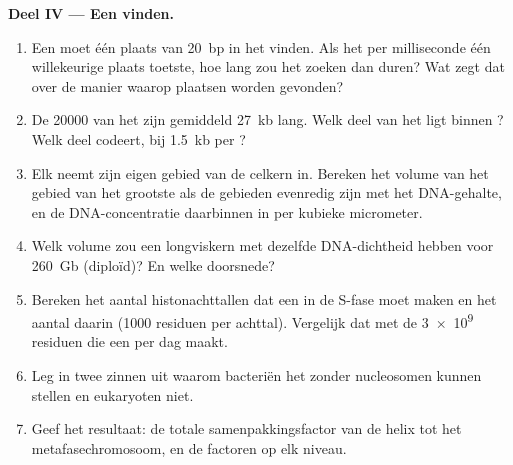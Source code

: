 \begin{problem}
\medskip
\noindent\textbf{Deel IV --- Een  vinden.}
\begin{enumerate}[resume]
  \item Een  moet één plaats van \qty{20}{bp} in het  vinden.
        Als het per milliseconde één willekeurige plaats toetste, hoe lang
        zou het zoeken dan duren? Wat zegt dat over de manier waarop
        plaatsen worden gevonden?
  \item De \qty{20000}{}  van het  zijn gemiddeld \qty{27}{kb}
        lang. Welk deel van het  ligt binnen ? Welk deel
        codeert, bij \qty{1.5}{kb}  per ?
  \item Elk  neemt zijn eigen gebied van de celkern in. Bereken
        het volume van het gebied van het grootste  als de
        gebieden evenredig zijn met het DNA-gehalte, en de DNA-concentratie
        daarbinnen in  per kubieke micrometer.
  \item Welk volume zou een longviskern met dezelfde DNA-dichtheid hebben
        voor \qty{260}{Gb} (diploïd)? En welke doorsnede?
  \item Bereken het aantal histonachttallen dat een  in de S-fase moet
        maken en het aantal  daarin (\qty{1000}{} residuen per
        achttal). Vergelijk dat met de \qty{3e9}{} residuen  die een
         per dag maakt.
  \item Leg in twee zinnen uit waarom bacteriën het zonder nucleosomen
        kunnen stellen en eukaryoten niet.
  \item Geef het resultaat: de totale samenpakkingsfactor van de helix tot
        het metafasechromosoom, en de factoren op elk niveau.
\end{enumerate}
\end{problem}

